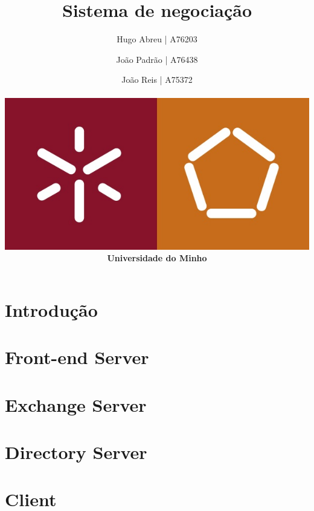 \documentclass[a4paper,12pt]{article}
\title{Sistema de negociação}
\author{Hugo Abreu | A76203 \and João Padrão | A76438\and João Reis | A75372
\\\\ \includegraphics[scale=0.25]{um_eeng} \\ \textbf{Universidade do Minho}}
\begin{document}
\maketitle


\section{Introdução}

\section{Front-end Server}

\section{Exchange Server}

\section{Directory Server}

\section{Client}
\end{document}
